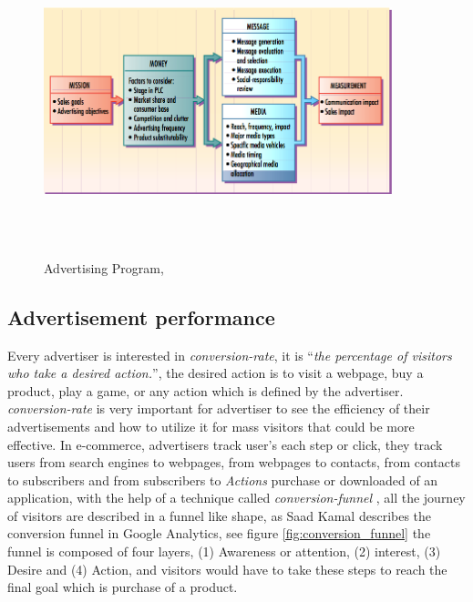 \begin{figure}[H]
\centering
\includegraphics[width=0.9\textwidth,height=90mm]{Figures/2/adprogram}
\caption{Advertising Program, \cite{adprogram}}
\label{fig:adprograme}
\end{figure}




\subsection{Advertisement performance}

Every advertiser is interested in \emph{conversion-rate}, it is ``\emph{the percentage of visitors who take a desired action.}''\cite{convrate}, the desired action is to visit a webpage, buy a product, play a game, or any action which is defined by the advertiser. \emph{conversion-rate} is very important for advertiser to see the efficiency of their advertisements and how to utilize it for mass visitors that could be more effective. In e-commerce, advertisers track user’s each step or click, they track users from search engines to webpages, from webpages to contacts, from contacts to subscribers and from subscribers to \emph{Actions} purchase or downloaded of an application, with the help of a technique called \emph{conversion-funnel} \cite{convfunnel}, all the journey of visitors are described in a funnel like shape, as Saad Kamal \cite{googlefunnel} describes the conversion funnel in Google Analytics, see figure \ref{fig:conversion_funnel} the funnel is composed of four layers, (1) Awareness or attention, (2) interest, (3) Desire and (4) Action, and visitors would have to take these steps to reach the final goal which is purchase of a product. 

